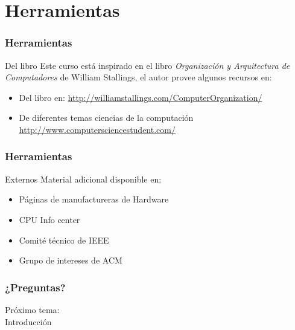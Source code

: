 \documentclass{beamer}
\begin{document}
	\section{Herramientas}
	\begin{frame}
		\frametitle{Herramientas}
		\begin{block}{Del libro}
		Este curso está inspirado en el libro \textit{Organización y Arquitectura de
Computadores} de William Stallings, el autor provee algunos recursos  en:
		\begin{itemize}
			\item Del libro en:  \url{http://williamstallings.com/ComputerOrganization/}
			\item De diferentes temas ciencias de la computación \url{http://www.computersciencestudent.com/}
		\end{itemize}
		\end{block}
	\end{frame}		
	\begin{frame}
		\frametitle{Herramientas}
		\begin{block}{Externos}
		Material adicional disponible en:
		\begin{itemize}
			\item Páginas de manufactureras de Hardware
			\item CPU Info center
			\item Comité técnico de IEEE
			\item Grupo de intereses de ACM
		\end{itemize}
		\end{block}
	\end{frame}		
	
\begin{frame}
	\frametitle{¿Preguntas?}
	\centering
	Próximo tema: \\Introducción
\end{frame}					
			
\end{document}
